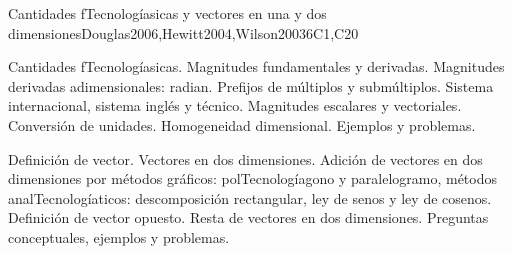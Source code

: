 \begin{syllabus}
\begin{outcomes}
\item {}
\item {}
\end{outcomes}

\begin{competences}
    \item {}
\end{competences}

\begin{unit}{Cantidades fTecnologíasicas y vectores en una y dos dimensiones}{}{Douglas2006,Hewitt2004,Wilson2003}{6}{C1,C20}
\begin{topics}
      \item Cantidades fTecnologíasicas. Magnitudes fundamentales y derivadas. Magnitudes derivadas adimensionales: radian. Prefijos de múltiplos y submúltiplos. Sistema internacional, sistema inglés y técnico. Magnitudes escalares y vectoriales. Conversión de unidades. Homogeneidad dimensional. Ejemplos y problemas.
      \item Definición de vector. Vectores en dos dimensiones. Adición de vectores en dos dimensiones por métodos gráficos: polTecnologíagono y paralelogramo, métodos analTecnologíaticos: descomposición rectangular, ley de senos y ley de cosenos. Definición de vector opuesto. Resta de vectores en dos dimensiones. Preguntas conceptuales, ejemplos y problemas.
   \end{topics}

\end{unit}


\end{syllabus}

